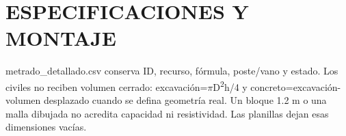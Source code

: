 \documentclass[12pt,letterpaper]{report}
\begin{document}
\hypersetup{pageanchor=false}
\clearpage\hypersetup{pageanchor=true}\tableofcontents\clearpage
\chapter*{ESPECIFICACIONES Y MONTAJE}
metrado\_\allowbreak{}detallado.csv conserva ID, recurso, fórmula, poste/vano y estado. Los civiles no reciben volumen cerrado: excavación=\ensuremath{\pi}D\textsuperscript{2}h/4 y concreto=excavación-volumen desplazado cuando se defina geometría real. Un bloque 1.2 m o una malla dibujada no acredita capacidad ni resistividad. Las planillas dejan esas dimensiones vacías.




\end{document}
